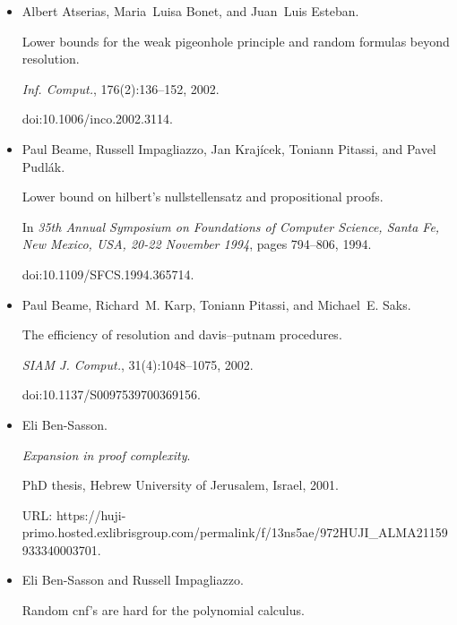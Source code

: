 \documentclass[10pt,a4paper]{article}
\begin{document}
\begin{itemize}
\item[] 
[9]

Albert Atserias, Maria Luisa Bonet, and Juan Luis Esteban.


Lower bounds for the weak pigeonhole principle and random formulas
beyond resolution.


\emph{Inf. Comput.}, 176(2):136–152, 2002.


doi:10.1006/inco.2002.3114.





\item[] 
[10]

Paul Beame, Russell Impagliazzo, Jan Krajícek, Toniann Pitassi, and
Pavel Pudlák.


Lower bound on hilbert’s nullstellensatz and propositional proofs.


In \emph{35th Annual Symposium on Foundations of Computer Science,
Santa Fe, New Mexico, USA, 20-22 November 1994}, pages 794–806, 1994.


doi:10.1109/SFCS.1994.365714.





\item[] 
[11]

Paul Beame, Richard M. Karp, Toniann Pitassi, and Michael E. Saks.


The efficiency of resolution and davis–putnam procedures.


\emph{SIAM J. Comput.}, 31(4):1048–1075, 2002.


doi:10.1137/S0097539700369156.





\item[] 
[12]

Eli Ben-Sasson.


\emph{Expansion in proof complexity}.


PhD thesis, Hebrew University of Jerusalem, Israel, 2001.


URL:
https://huji-primo.hosted.exlibrisgroup.com/permalink/f/13ns5ae/972HUJI\_ALMA21159933340003701.





\item[] 
[13]

Eli Ben-Sasson and Russell Impagliazzo.


Random cnf’s are hard for the polynomial calculus.



\end{itemize}
\end{document}
